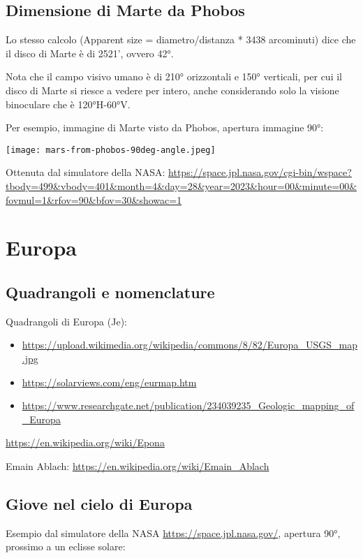\documentclass[a4paper,10pt,openany,oneside]{memoir}
\begin{document}
\section{Dimensione di Marte da Phobos}

Lo stesso calcolo (Apparent size  = diametro/distanza * 3438 arcominuti) dice che il disco di Marte è di 2521', ovvero 42°. 

Nota che il campo visivo umano è di 210° orizzontali e 150° verticali, per cui il disco di Marte si riesce a vedere per intero, anche considerando solo la visione binoculare che è 120°H-60°V.

Per esempio, immagine di Marte visto da Phobos, apertura immagine 90°:

\texttt{[image: mars-from-phobos-90deg-angle.jpeg]}

Ottenuta dal simulatore della NASA: \url{https://space.jpl.nasa.gov/cgi-bin/wspace?tbody=499&vbody=401&month=4&day=28&year=2023&hour=00&minute=00&fovmul=1&rfov=90&bfov=30&showac=1}




\chapter{Europa}

\section{Quadrangoli e nomenclature}
Quadrangoli di Europa (Je): 
\begin{itemize}
  \item \url{https://upload.wikimedia.org/wikipedia/commons/8/82/Europa_USGS_map.jpg}
  \item \url{https://solarviews.com/eng/eurmap.htm}
  \item \url{https://www.researchgate.net/publication/234039235_Geologic_mapping_of_Europa}
\end{itemize}

\url{https://en.wikipedia.org/wiki/Epona}

Emain Ablach: \url{https://en.wikipedia.org/wiki/Emain_Ablach}
  
\section{Giove nel cielo di Europa}

Esempio dal simulatore della NASA \url{https://space.jpl.nasa.gov/}, apertura 90°, prossimo a un eclisse solare:
\end{document}
